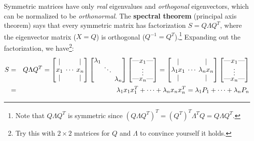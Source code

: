 \documentclass[11pt]{article}
\theoremstyle{plain}
\theoremstyle{definition}
\theoremstyle{remark}
\numberwithin{equation}{section}
\begin{document}
Symmetric matrices have only {\em real} eigenvalues and {\em orthogonal} eigenvectors, which can be normalized to be {\em orthonormal}. The {\bf spectral theorem} (principal axis theorem) says that every symmetric matrix has factorization $S = Q \Lambda Q^T$, where the eigenvector matrix ($X = Q$) is orthogonal ($Q^{-1} = Q^T$).\footnote{Note that $Q \Lambda Q^T$ is symmetric since $(Q \Lambda Q^T)^T = (Q^T)^T \Lambda^T Q = Q \Lambda Q^T$.} Expanding out the factorization, we have\footnote{Try this with $2 \times 2$ matrices for $Q$ and $\Lambda$ to convince yourself it holds.}:
\begin{eqnarray*}
S & = & Q \Lambda Q^T =  \begin{bmatrix} | & & | \\ x_1 & \hspace{-2em} \cdots \hspace{-2em}  & x_n \\ | & & | \end{bmatrix} \begin{bmatrix} \vspace{-0.3em} \lambda_1 & &  \\  & \hspace{-1em} \ddots \hspace{-1em} &  \\  & & \lambda_n \end{bmatrix} \begin{bmatrix} \text{---} \hspace{-1em} & x_1 & \hspace{-1em} \text{---} \\ & \vspace{-0.2em} \vdots  \vspace{-0.2em} & \\ \text{---} \hspace{-1em} & x_n & \hspace{-1em} \text{---} \end{bmatrix} = \begin{bmatrix} | & & | \\ \lambda_1 x_1 & \hspace{-2em} \cdots \hspace{-2em}  & \lambda_n x_n \\ | & & | \end{bmatrix} \begin{bmatrix} \text{---} \hspace{-1em} & x_1 & \hspace{-1em} \text{---} \\ & \vspace{-0.2em} \vdots  \vspace{-0.2em} & \\ \text{---} \hspace{-1em} & x_n & \hspace{-1em} \text{---} \end{bmatrix} \\
& = & \lambda_1 x_1 x_1^T + \cdots + \lambda_n x_n x_n^T = \lambda_1 P_1 + \cdots + \lambda_n P_n
\end{eqnarray*}
\end{document}
